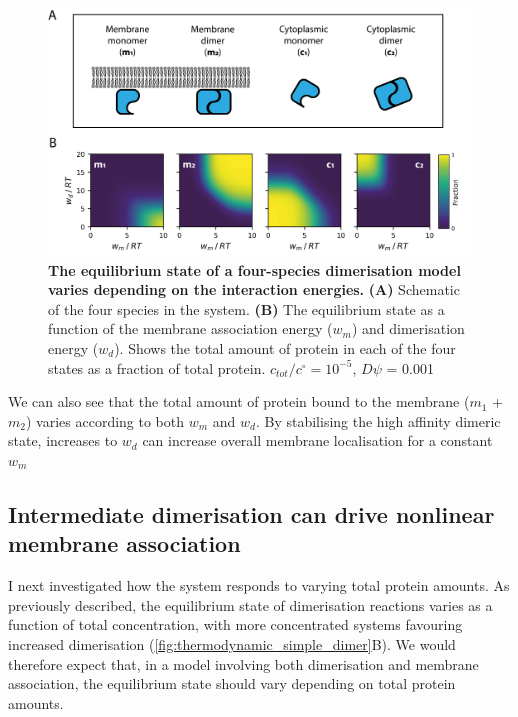 \documentclass[12pt]{"report"}
\newcommand{\mycaption}[2]{\caption[#1]{\textbf{#1.} #2}}
\begin{document}
\begin{figure}
\includegraphics[scale=0.9]{thermodynamic_model_species}
\centering
\mycaption{The equilibrium state of a four-species dimerisation model varies depending on the interaction energies}{
\textbf{(A)} Schematic of the four species in the system.
\textbf{(B)} The equilibrium state as a function of the membrane association energy ($w_m$) and dimerisation energy ($w_d$). Shows the total amount of protein in each of the four states as a fraction of total protein. $c_{tot} / c^{\circ} = 10^{-5}$, $D\psi$ = 0.001}
\label{fig:thermodynamic_model_species}
\end{figure}

We can also see that the total amount of protein bound to the membrane ($m_1$ + $m_2$) varies according to both $w_m$ and $w_d$. By stabilising the high affinity dimeric state, increases to $w_d$ can increase overall membrane localisation for a constant $w_m$\\


\subsection{Intermediate dimerisation can drive nonlinear membrane association}

I next investigated how the system responds to varying total protein amounts. As previously described, the equilibrium state of dimerisation reactions varies as a function of total concentration, with more concentrated systems favouring increased dimerisation (\cref{fig:thermodynamic_simple_dimer}B). We would therefore expect that, in a model involving both dimerisation and membrane association, the equilibrium state should vary depending on total protein amounts.\\
\end{document}
